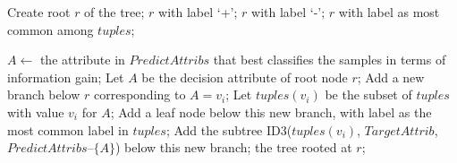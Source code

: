 \begin{algorithm}[!h]
    \begin{algorithmic}
        \State Create root $r$ of the tree;
            \State \Return $r$ with label `+';
        \EndIf
            \State \Return $r$ with label `-';
        \EndIf
            \State \Return $r$ with label as most common among $tuples$;
        \EndIf

        \State $A\leftarrow$ the attribute in $PredictAttribs$ that best classifies the samples in terms of information gain;
        \State Let $A$ be the decision attribute of root node $r$;
            \State Add a new branch below $r$ corresponding to $A=v_i$;
            \State Let $tuples(v_i)$ be the subset of $tuples$ with value $v_i$ for $A$;
                \State Add a leaf node below this new branch, with label as the most common label in $tuples$;
            \Else
                \State Add the subtree ID3($tuples(v_i)$, $TargetAttrib$, $PredictAttribs – \{A\}$) below this new branch;
            \EndIf
        \EndFor
        \State \Return the tree rooted at $r$;
    \EndFunction
  \end{algorithmic}
\end{algorithm}





